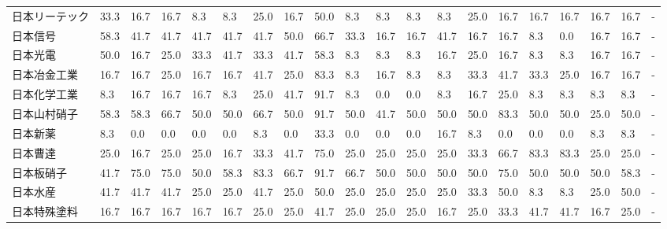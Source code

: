 \documentclass[a4paper，11pt]{jsarticle}
\begin{document}
\begin{longtable}[c]{lp{3mm}p{3mm}p{3mm}p{3mm}p{3mm}p{3mm}p{3mm}p{3mm}p{3mm}p{3mm}p{3mm}p{3mm}p{3mm}p{3mm}p{3mm}p{3mm}p{3mm}p{3mm}p{3mm}}
日本リーテック         &   33.3 &   16.7 &      16.7 &       8.3 &        8.3 &   25.0 &   16.7 &   50.0 &     8.3 &     8.3 &    8.3 &   8.3 &   25.0 &    16.7 &    16.7 &  16.7 &  16.7 &  16.7 &     - \\
日本信号            &   58.3 &   41.7 &      41.7 &      41.7 &       41.7 &   41.7 &   50.0 &   66.7 &    33.3 &    16.7 &   16.7 &  41.7 &   16.7 &    16.7 &     8.3 &   0.0 &  16.7 &  16.7 &     - \\
日本光電            &   50.0 &   16.7 &      25.0 &      33.3 &       41.7 &   33.3 &   41.7 &   58.3 &     8.3 &     8.3 &    8.3 &  16.7 &   25.0 &    16.7 &     8.3 &   8.3 &  16.7 &  16.7 &     - \\
日本冶金工業          &   16.7 &   16.7 &      25.0 &      16.7 &       16.7 &   41.7 &   25.0 &   83.3 &     8.3 &    16.7 &    8.3 &   8.3 &   33.3 &    41.7 &    33.3 &  25.0 &  16.7 &  16.7 &     - \\
日本化学工業          &    8.3 &   16.7 &      16.7 &      16.7 &        8.3 &   25.0 &   41.7 &   91.7 &     8.3 &     0.0 &    0.0 &   8.3 &   16.7 &    25.0 &     8.3 &   8.3 &   8.3 &   8.3 &     - \\
日本山村硝子          &   58.3 &   58.3 &      66.7 &      50.0 &       50.0 &   66.7 &   50.0 &   91.7 &    50.0 &    41.7 &   50.0 &  50.0 &   50.0 &    83.3 &    50.0 &  50.0 &  25.0 &  50.0 &     - \\
日本新薬            &    8.3 &    0.0 &       0.0 &       0.0 &        0.0 &    8.3 &    0.0 &   33.3 &     0.0 &     0.0 &    0.0 &  16.7 &    8.3 &     0.0 &     0.0 &   0.0 &   8.3 &   8.3 &     - \\
日本曹達            &   25.0 &   16.7 &      25.0 &      25.0 &       16.7 &   33.3 &   41.7 &   75.0 &    25.0 &    25.0 &   25.0 &  25.0 &   33.3 &    66.7 &    83.3 &  83.3 &  25.0 &  25.0 &     - \\
日本板硝子           &   41.7 &   75.0 &      75.0 &      50.0 &       58.3 &   83.3 &   66.7 &   91.7 &    66.7 &    50.0 &   50.0 &  50.0 &   50.0 &    75.0 &    50.0 &  50.0 &  50.0 &  58.3 &     - \\
日本水産            &   41.7 &   41.7 &      41.7 &      25.0 &       25.0 &   41.7 &   25.0 &   50.0 &    25.0 &    25.0 &   25.0 &  25.0 &   33.3 &    50.0 &     8.3 &   8.3 &  25.0 &  50.0 &     - \\
日本特殊塗料          &   16.7 &   16.7 &      16.7 &      16.7 &       16.7 &   25.0 &   25.0 &   41.7 &    25.0 &    25.0 &   25.0 &  16.7 &   25.0 &    33.3 &    41.7 &  41.7 &  16.7 &  25.0 &     - \\

\end{longtable}
\end{document}
